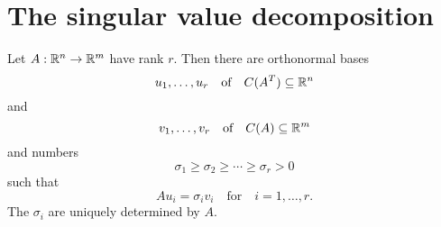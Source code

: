 \documentclass[12pt]{amsart}
\begin{document}
\section{The singular value decomposition}
\begin{theorem}\label{T:SVD}
    Let $A:\mathbb{R}^n\to \mathbb{R}^m$ have rank $r$.
    Then there are orthonormal bases 
    \[
        u_1,\ldots,u_r\quad\text{of}\quad C(A^T)\subseteq \mathbb{R}^n
    \]
    and
    \[
        v_1,\ldots,v_r\quad\text{of}\quad C(A)\subseteq \mathbb{R}^m
    \]
    and numbers
    \[
        \sigma_1\geq\sigma_2\geq\cdots\geq \sigma_r>0
    \]
    such that
    \[
        Au_i = \sigma_i v_i\quad\text{for}\quad i=1,\ldots,r.
    \]
    The $\sigma_i$ are uniquely determined by $A$.
\end{theorem}
\end{document}
